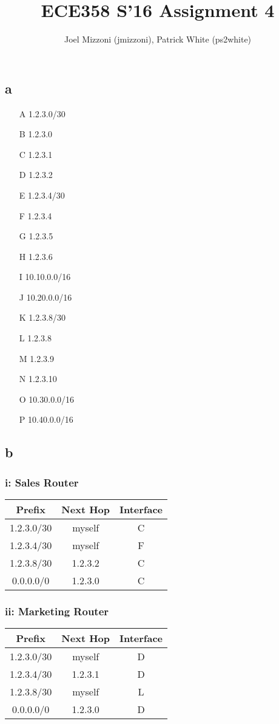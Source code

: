\documentclass[10pt,a4paper]{article}
\author{Joel Mizzoni (jmizzoni), Patrick White (ps2white)}
\begin{document}
\title{ECE358 S'16 Assignment 4}
\maketitle
\section{}
\subsection*{a}
\begin{itemize}
    \item[A] 1.2.3.0/30
    \item[B] 1.2.3.0
    \item[C] 1.2.3.1
    \item[D] 1.2.3.2
    \item[E] 1.2.3.4/30
    \item[F] 1.2.3.4
    \item[G] 1.2.3.5
    \item[H] 1.2.3.6
    \item[I] 10.10.0.0/16
    \item[J] 10.20.0.0/16
    \item[K] 1.2.3.8/30
    \item[L] 1.2.3.8
    \item[M] 1.2.3.9
    \item[N] 1.2.3.10
    \item[O] 10.30.0.0/16
    \item[P] 10.40.0.0/16
\end{itemize}
\subsection*{b}
\subsubsection*{i: Sales Router}
\begin{tabular}{c c c}
    \toprule
    \textbf{Prefix} & \textbf{Next Hop} & \textbf{Interface} \\\midrule
    1.2.3.0/30 & myself & C \\
    1.2.3.4/30 & myself & F \\
    1.2.3.8/30 & 1.2.3.2 & C \\
    0.0.0.0/0 & 1.2.3.0 & C \\\bottomrule
\end{tabular}
\subsubsection*{ii: Marketing Router}
\begin{tabular}{c c c}
    \toprule
    \textbf{Prefix} & \textbf{Next Hop} & \textbf{Interface} \\\midrule
    1.2.3.0/30 & myself & D \\
    1.2.3.4/30 & 1.2.3.1 & D \\
    1.2.3.8/30 & myself & L \\
    0.0.0.0/0 & 1.2.3.0 & D \\\bottomrule
\end{tabular}
\end{document}
